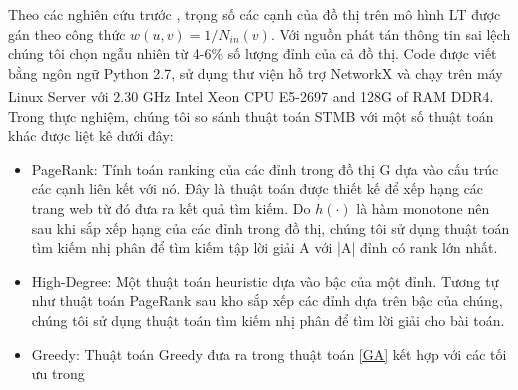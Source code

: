 Theo các nghiên cứu trước \cite{khali, kemple1,chen10LT}, trọng số các cạnh của đồ thị trên mô hình LT được gán theo công thức $w(u,v) = 1/N_{in}(v)$. Với nguồn phát tán thông tin sai lệch chúng tôi chọn ngẫu nhiên từ 4-6\% số lượng đỉnh của cả đồ thị. Code được viết bằng ngôn ngữ Python 2.7, sử dụng thư viện hỗ trợ NetworkX và chạy trên máy Linux Server với 2.30 GHz Intel\textsuperscript{\textregistered} Xeon\textsuperscript{\textregistered} CPU E5-2697 and 128G of RAM DDR4. Trong thực nghiệm, chúng tôi so sánh thuật toán STMB với một số thuật toán khác được liệt kê dưới đây:
\begin {itemize}
\item PageRank: Tính toán ranking của các đỉnh trong đồ thị G dựa vào cấu trúc các cạnh liên kết với nó. Đây là thuật toán được thiết kế để xếp hạng các trang web từ đó đưa ra kết quả tìm kiếm. Do $h(\cdot)$ là hàm monotone nên sau khi sắp xếp hạng của các đỉnh trong đồ thị, chúng tôi sử dụng thuật toán tìm kiếm nhị phân để tìm kiếm tập lời giải A với |A| đỉnh có rank lớn nhất.
\item High-Degree: Một thuật toán heuristic dựa vào bậc của một đỉnh. Tương tự như thuật toán PageRank sau kho sắp xếp các đỉnh dựa trên bậc của chúng, chúng tôi sử dụng thuật toán tìm kiếm nhị phân để tìm lời giải cho bài toán.
\item Greedy: Thuật toán Greedy đưa ra trong thuật toán \ref{GA} kết hợp với các tối ưu trong \cite{Jleskovec}
\end{itemize} 

